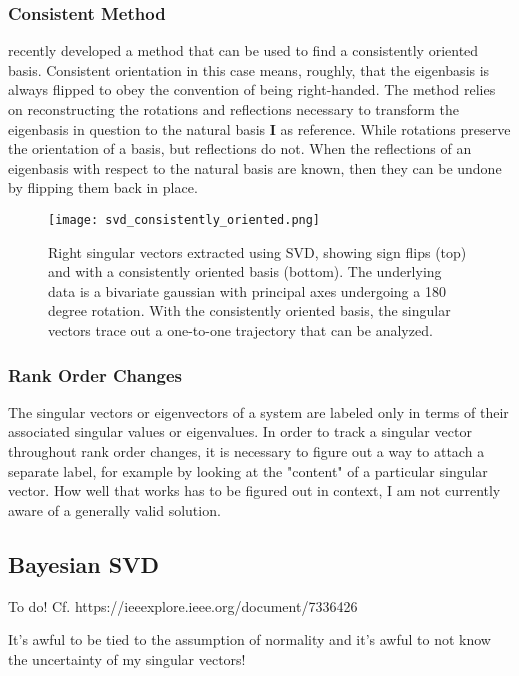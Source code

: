 \subsubsection{Consistent Method}

 recently developed a method that can be used to find a consistently oriented basis. Consistent orientation in this case means, roughly, that the eigenbasis is always flipped to obey the convention of being right-handed. The method relies on reconstructing the rotations and reflections necessary to transform the eigenbasis in question to the natural basis $\mathbf{I}$ as reference. While rotations preserve the orientation of a basis, but reflections do not. When the reflections of an eigenbasis with respect to the natural basis are known, then they can be undone by flipping them back in place. 


\begin{figure}
\centering
    \texttt{[image: svd\_consistently\_oriented.png]}
    \caption{Right singular vectors extracted using SVD, showing sign flips (top) and with a consistently oriented basis (bottom). The underlying data is a bivariate gaussian with principal axes undergoing a 180 degree rotation. With the consistently oriented basis, the singular vectors trace out a one-to-one trajectory that can be analyzed.}
    \label{fig:svd_consistently_oriented}
\end{figure}


\subsubsection{Rank Order Changes}
	
The singular vectors or eigenvectors of a system are labeled only in terms of their associated singular values or eigenvalues. In order to track a singular vector throughout rank order changes, it is necessary to figure out a way to attach a separate label, for example by looking at the "content" of a particular singular vector. How well that works has to be figured out in context, I am not currently aware of a generally valid solution. 


\subsection{Bayesian SVD}
To do! Cf. https://ieeexplore.ieee.org/document/7336426

It's awful to be tied to the assumption of normality and it's awful to not know the uncertainty of my singular vectors!







